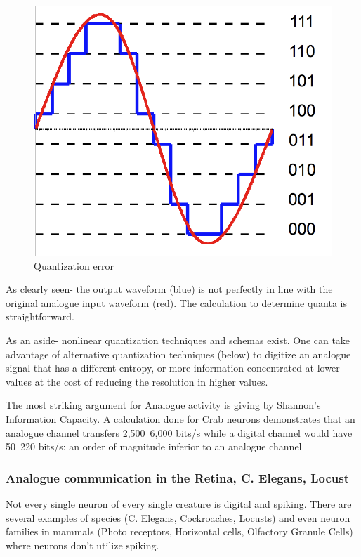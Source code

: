 \documentclass[main]{subfiles}
\begin{document}
\begin{figure}[H]
	\centering
	\includegraphics[width=0.9\linewidth]{09_WhySpikes/figures/3-bit_resolution_analog_comparison.png}
	\caption{Quantization error}
\end{figure}

As clearly seen- the output waveform (blue) is not perfectly in line with the original analogue input waveform (red). The calculation to determine quanta is straightforward.

As an aside- nonlinear quantization techniques and schemas exist. One can take advantage of alternative quantization techniques (below) to digitize an analogue signal that has a different entropy, or more information concentrated at lower values at the cost of reducing the resolution in higher values.

The most striking argument for Analogue activity is giving by Shannon's Information Capacity.
A calculation done for Crab neurons demonstrates that an analogue channel transfers 2,500~6,000 bits/s while a digital channel would have 50~220 bits/s: an order of magnitude inferior to an analogue channel


\subsubsection{Analogue communication in the Retina, C. Elegans, Locust}

Not every single neuron of every single creature is digital and spiking. There are several examples of species (C. Elegans, Cockroaches, Locusts) and even neuron families in mammals (Photo receptors, Horizontal cells, Olfactory Granule Cells) where neurons don't utilize spiking. 
\end{document}
